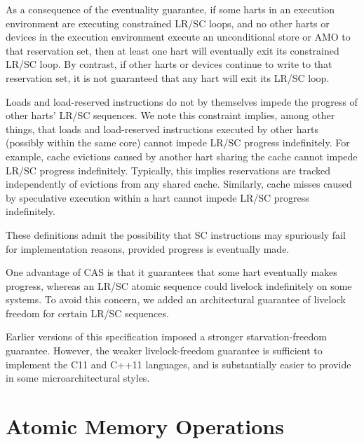 \begin{commentary}
As a consequence of the eventuality guarantee, if some harts in an execution
environment are executing constrained LR/SC loops, and no other harts or
devices in the execution environment execute an unconditional store or AMO to
that reservation set, then at least one hart will eventually exit its
constrained LR/SC loop.
By contrast, if other harts or devices continue to write to that reservation
set, it is not guaranteed that any hart will exit its LR/SC loop.

Loads and load-reserved instructions do not by themselves impede the progress
of other harts' LR/SC sequences.
We note this constraint implies, among other things, that loads and
load-reserved instructions executed by other harts (possibly within the same
core) cannot impede LR/SC progress indefinitely.
For example, cache evictions caused by another hart sharing the cache cannot
impede LR/SC progress indefinitely.
Typically, this implies reservations are tracked independently of
evictions from any shared cache.
Similarly, cache misses caused by speculative execution within a hart cannot
impede LR/SC progress indefinitely.

These definitions admit the possibility that SC instructions may spuriously
fail for implementation reasons, provided progress is eventually made.
\end{commentary}

\begin{commentary}
One advantage of CAS is that it guarantees that some hart eventually
makes progress, whereas an LR/SC atomic sequence could livelock
indefinitely on some systems.  To avoid this concern, we added an
architectural guarantee of livelock freedom for certain LR/SC sequences.

Earlier versions of this specification imposed a stronger starvation-freedom
guarantee.  However, the weaker livelock-freedom guarantee is sufficient to
implement the C11 and C++11 languages, and is substantially easier to provide
in some microarchitectural styles.
\end{commentary}

\section{Atomic Memory Operations}
\label{sec:amo}

